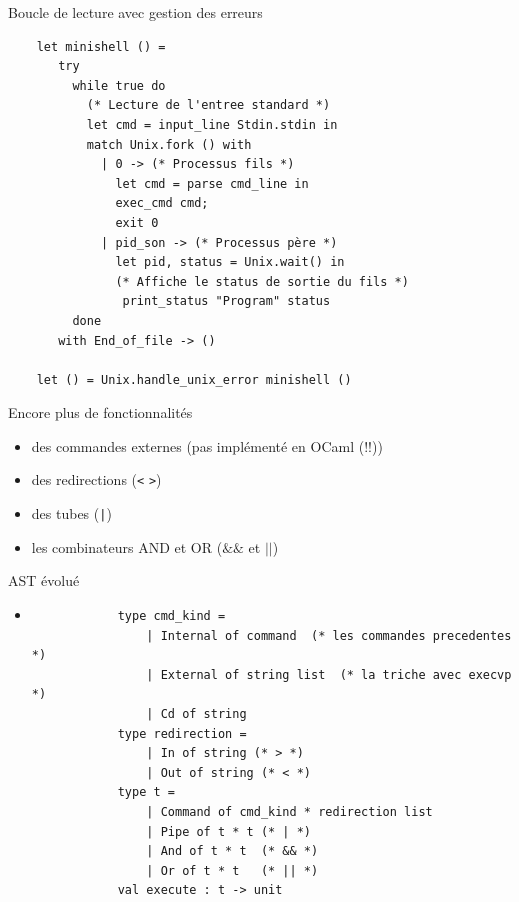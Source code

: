 \begin{frame}[fragile]{Boucle de lecture avec gestion des erreurs}
\begin{lstlisting}
    let minishell () =
       try
         while true do
           (* Lecture de l'entree standard *)
           let cmd = input_line Stdin.stdin in
           match Unix.fork () with
             | 0 -> (* Processus fils *)
               let cmd = parse cmd_line in
               exec_cmd cmd;
               exit 0
             | pid_son -> (* Processus père *)
               let pid, status = Unix.wait() in
               (* Affiche le status de sortie du fils *)
                print_status "Program" status
         done
       with End_of_file -> ()

    let () = Unix.handle_unix_error minishell ()
\end{lstlisting}
\end{frame}
\begin{frame}{Encore plus de fonctionnalités}
  \begin{itemize}[label=\small{}]
  \item des commandes externes (pas implémenté en OCaml (!!))
  \item des redirections (\texttt{<} \texttt{>})
  \item des tubes  (\texttt{|})
  \item les combinateurs AND et OR  (\texttt{$\&\&$} et \texttt{$||$})
  \end{itemize}
\end{frame}

\begin{frame}[fragile]{AST évolué}
    \begin{itemize}[leftmargin=-10pt]
         \item
        \begin{lstlisting}
            type cmd_kind =
                | Internal of command  (* les commandes precedentes *)
                | External of string list  (* la triche avec execvp *)
                | Cd of string
            type redirection =
                | In of string (* > *)
                | Out of string (* < *)
            type t =
                | Command of cmd_kind * redirection list
                | Pipe of t * t (* | *)
                | And of t * t  (* && *)
                | Or of t * t   (* || *)
            val execute : t -> unit
        \end{lstlisting}
    \end{itemize}
\end{frame}



